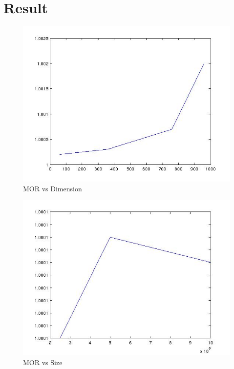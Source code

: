 \documentclass[10pt]{extarticle}
\begin{document}
\newpage

\section*{Result}

\begin{figure}[h]
\centering
\includegraphics[scale=0.25]{Dim_MOR}
\caption{MOR vs Dimension}
\end{figure}

\begin{figure}[h]
\centering
\includegraphics[scale=0.25]{SIze_MOR}
\caption{MOR vs Size}
\end{figure}
\end{document}

